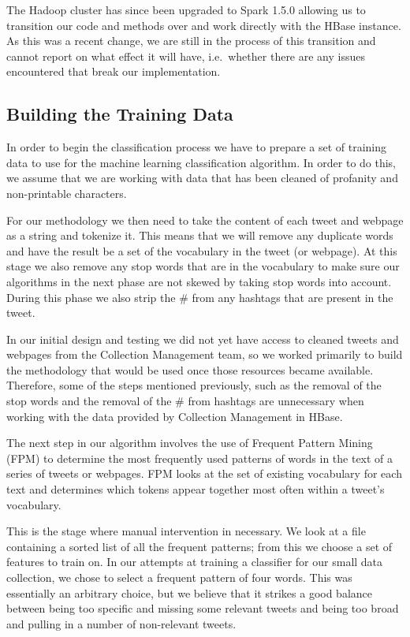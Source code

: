 The Hadoop cluster has since been upgraded to Spark 1.5.0 allowing us to transition our code and methods over and work directly with the HBase instance. As this was a recent change, we are still in the process of this transition and cannot report on what effect it will have, i.e.\ whether there are any issues encountered that break our implementation.

\subsection{Building the Training Data}
In order to begin the classification process we have to prepare a set of training data to use for the machine learning classification algorithm. In order to do this, we assume that we are working with data that has been cleaned of profanity and non-printable characters.

For our methodology we then need to take the content of each tweet and webpage as a string and tokenize it. This means that we will remove any duplicate words and have the result be a set of the vocabulary in the tweet (or webpage). At this stage we also remove any stop words that are in the vocabulary to make sure our algorithms in the next phase are not skewed by taking stop words into account. During this phase we also strip the \# from any hashtags that are present in the tweet.

In our initial design and testing we did not yet have access to cleaned tweets and webpages from the Collection Management team, so we worked primarily to build the methodology that would be used once those resources became available. Therefore, some of the steps mentioned previously, such as the removal of the stop words and the removal of the \# from hashtags are unnecessary when working with the data provided by Collection Management in HBase.

The next step in our algorithm involves the use of Frequent Pattern Mining (FPM) to determine the most frequently used patterns of words in the text of a series of tweets or webpages. FPM looks at the set of existing vocabulary for each text and determines which tokens appear together most often within a tweet's vocabulary.

This is the stage where manual intervention in necessary. We look at a file containing a sorted list of all the frequent patterns; from this we choose a set of features to train on. In our attempts at training a classifier for our small data collection, we chose to select a frequent pattern of four words. This was essentially an arbitrary choice, but we believe that it strikes a good balance between being too specific and missing some relevant tweets and being too broad and pulling in a number of non-relevant tweets.

